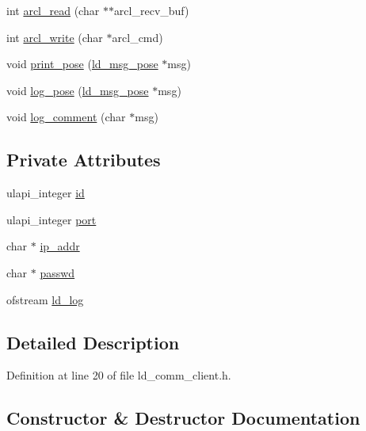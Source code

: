 \begin{DoxyCompactItemize}
\item 
int \mbox{\hyperlink{classld__comm__client_ad43c866e91c88f9dfd7e50fdec941607}{arcl\+\_\+read}} (char $\ast$$\ast$arcl\+\_\+recv\+\_\+buf)
\item 
int \mbox{\hyperlink{classld__comm__client_af044c54c00fe8b8f1528eb094b11ad88}{arcl\+\_\+write}} (char $\ast$arcl\+\_\+cmd)
\item 
void \mbox{\hyperlink{classld__comm__client_a29a4395433e6f9d9ec7c3589de7ae211}{print\+\_\+pose}} (\mbox{\hyperlink{structld__msg__pose}{ld\+\_\+msg\+\_\+pose}} $\ast$msg)
\item 
void \mbox{\hyperlink{classld__comm__client_a2b9b335282497b7b52b7f9a0e624ffe9}{log\+\_\+pose}} (\mbox{\hyperlink{structld__msg__pose}{ld\+\_\+msg\+\_\+pose}} $\ast$msg)
\item 
void \mbox{\hyperlink{classld__comm__client_a8e2124bb6da72ba99ab9d713510e2303}{log\+\_\+comment}} (char $\ast$msg)
\end{DoxyCompactItemize}
\subsection*{Private Attributes}
\begin{DoxyCompactItemize}
\item 
ulapi\+\_\+integer \mbox{\hyperlink{classld__comm__client_ae6503fd1049ca849c6d49cf38c56d5aa}{id}}
\item 
ulapi\+\_\+integer \mbox{\hyperlink{classld__comm__client_a78947765ccf3fcb1f85558427db9e4de}{port}}
\item 
char $\ast$ \mbox{\hyperlink{classld__comm__client_aad5cf14a1d33d95538c31ca525dcc9e4}{ip\+\_\+addr}}
\item 
char $\ast$ \mbox{\hyperlink{classld__comm__client_ab914c19b95803935ccef004d740b6a99}{passwd}}
\item 
ofstream \mbox{\hyperlink{classld__comm__client_ae7c62ed3fe8a6dbdf0880787aa66ef22}{ld\+\_\+log}}
\end{DoxyCompactItemize}


\subsection{Detailed Description}


Definition at line 20 of file ld\+\_\+comm\+\_\+client.\+h.



\subsection{Constructor \& Destructor Documentation}
\mbox{\label{classld__comm__client_abc88de149791710a26470a290de031ef}} 
